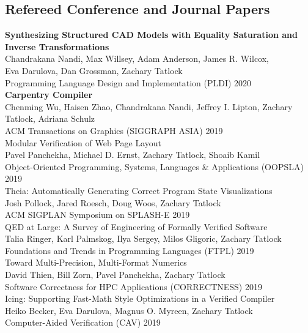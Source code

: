 \documentclass[10pt]{article}
\begin{document}
\subsection*{Refereed Conference and Journal Papers}

\textbf{%
Synthesizing Structured CAD Models with
Equality Saturation and Inverse Transformations
} \\
Chandrakana Nandi, Max Willsey, Adam Anderson, James R. Wilcox, \\
Eva Darulova, Dan Grossman, Zachary Tatlock \\
Programming Language Design and Implementation (PLDI) 2020 \\

\textbf{%
Carpentry Compiler
} \\
Chenming Wu, Haisen Zhao, Chandrakana Nandi, Jeffrey I. Lipton, Zachary Tatlock, Adriana Schulz \\
ACM Transactions on Graphics (SIGGRAPH ASIA) 2019 \\

Modular Verification of Web Page Layout \\
Pavel Panchekha, Michael D. Ernst, Zachary Tatlock, Shoaib Kamil \\
Object-Oriented Programming, Systems, Languages \& Applications (OOPSLA) 2019 \\

Theia: Automatically Generating Correct Program State Visualizations \\
Josh Pollock, Jared Roesch, Doug Woos, Zachary Tatlock \\
ACM SIGPLAN Symposium on SPLASH-E 2019 \\

QED at Large: A Survey of Engineering of Formally Verified Software \\
Talia Ringer, Karl Palmskog, Ilya Sergey, Milos Gligoric, Zachary Tatlock \\
Foundations and Trends in Programming Languages (FTPL) 2019 \\

Toward Multi-Precision, Multi-Format Numerics \\
David Thien, Bill Zorn, Pavel Panchekha, Zachary Tatlock \\
Software Correctness for HPC Applications (CORRECTNESS) 2019 \\

Icing: Supporting Fast-Math Style Optimizations in a Verified Compiler \\
Heiko Becker, Eva Darulova, Magnus O. Myreen, Zachary Tatlock \\
Computer-Aided Verification (CAV) 2019 \\
\end{document}
